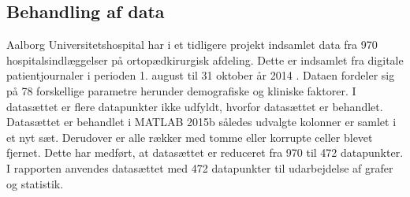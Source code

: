 \subsection*{Behandling af data}
Aalborg Universitetshospital har i et tidligere projekt indsamlet data fra 970 hospitalsindlæggelser på ortopædkirurgisk afdeling. Dette er indsamlet fra digitale patientjournaler i perioden 1. august til 31 oktober år 2014 . Dataen fordeler sig på 78 forskellige parametre herunder demografiske og kliniske faktorer. I datasættet er flere datapunkter ikke udfyldt, hvorfor datasættet er behandlet. 
Datasættet er behandlet i MATLAB 2015b således udvalgte kolonner er samlet i et nyt sæt. Derudover er alle rækker med tomme eller korrupte celler blevet fjernet. Dette har medført, at datasættet er reduceret fra 970 til 472 datapunkter. I rapporten anvendes datasættet med 472 datapunkter til udarbejdelse af grafer og statistik. 
 




